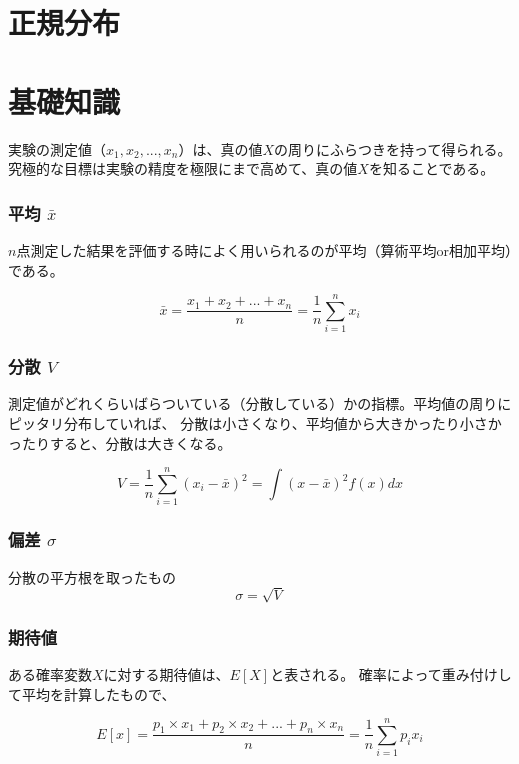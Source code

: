 \documentclass[uplatex]{jsarticle}
\begin{document}
\section{正規分布}

\section{基礎知識}

実験の測定値（$x_1,x_2,...,x_n$）は、真の値$X$の周りにふらつきを持って得られる。
究極的な目標は実験の精度を極限にまで高めて、真の値$X$を知ることである。

\subsubsection{平均 $\bar{x}$}
$n$点測定した結果を評価する時によく用いられるのが平均（算術平均or相加平均）である。

\begin{equation}
  \bar{x} = \frac{x_1 + x_2 + ... + x_n}{n}  = \frac{1}{n} \sum_{i=1}^{n} x_i
\end{equation}


\subsubsection{分散 $V$}
測定値がどれくらいばらついている（分散している）かの指標。平均値の周りにピッタリ分布していれば、
分散は小さくなり、平均値から大きかったり小さかったりすると、分散は大きくなる。

\begin{equation}
  V= \frac{1}{n}\sum_{i=1}^{n} (x_{i}-\bar{x})^{2} = \int (x-\bar{x})^2f(x)dx
\end{equation}

\subsubsection{偏差 $\sigma$}
分散の平方根を取ったもの
\begin{equation}
  \sigma = \sqrt{V}
\end{equation}

\subsubsection{期待値}
ある確率変数$X$に対する期待値は、$E[X]$と表される。 確率によって重み付けして平均を計算したもので、

\begin{equation}
  E[x] = \frac{p_1\times x_1+ p_2\times x_2+...+ p_n \times x_n}{n} = \frac{1}{n}\sum_{i=1}^{n} p_ix_i
\end{equation}
\end{document}
